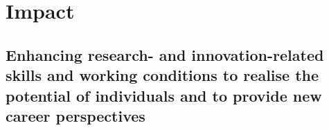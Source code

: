 \documentclass[a4paper,11pt]{article}
\newcommand{\TODO}[1]{{\textcolor{red}{[\textbf{TODO:} #1]}}}
\begin{document}
%
%
%

\section{Impact}
\label{sec:impact}


\subsection{Enhancing research- and innovation-related skills and working conditions to realise the potential of individuals and to provide new career perspectives}
\label{sec:enhancement}
\end{document}
